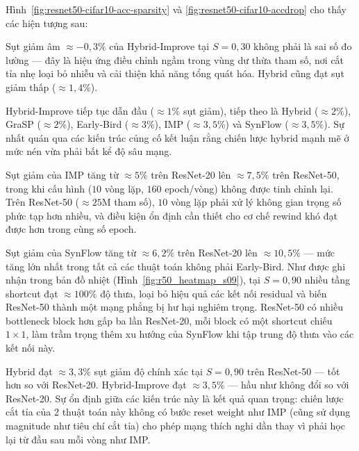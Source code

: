         Hình~\ref{fig:resnet50-cifar10-acc-sparsity} và \ref{fig:resnet50-cifar10-accdrop} cho thấy các hiện tượng sau:

        Sụt giảm âm $\approx-0{,}3\%$ của Hybrid-Improve tại $S=0{,}30$ không phải là sai số
        đo lường --- đây là hiệu ứng điều chỉnh ngầm trong vùng dư thừa tham số, nơi cắt tỉa
        nhẹ loại bỏ nhiễu và cải thiện khả năng tổng quát hóa.
        Hybrid cũng đạt sụt giảm thấp ($\approx1{,}4\%$).
        
        Hybrid-Improve tiếp tục dẫn đầu ($\approx1\%$ sụt giảm), tiếp theo là Hybrid
        ($\approx2\%$), GraSP ($\approx2\%$), Early-Bird ($\approx3\%$), IMP ($\approx3{,}5\%$)
        và SynFlow ($\approx3{,}5\%$).
        Sự nhất quán qua các kiến trúc củng cố kết luận rằng chiến lược hybrid mạnh mẽ ở mức nén
        vừa phải bất kể độ sâu mạng.
        
        Sụt giảm của IMP tăng từ $\approx5\%$ trên ResNet-20 lên $\approx7{,}5\%$ trên ResNet-50,
        trong khi cấu hình ($10$ vòng lặp, $160$ epoch/vòng) không được tinh chỉnh lại.
        Trên ResNet-50 ($\approx25$M tham số), $10$ vòng lặp phải xử lý không gian trọng số phức
        tạp hơn nhiều, và điều kiện ổn định cần thiết cho cơ chế rewind khó đạt được hơn trong
        cùng số epoch.
        
        Sụt giảm của SynFlow tăng từ $\approx6{,}2\%$ trên ResNet-20 lên $\approx10{,}5\%$ ---
        mức tăng lớn nhất trong tất cả các thuật toán không phải Early-Bird.
        Như được ghi nhận trong bản đồ nhiệt (Hình~\ref{fig:r50_heatmap_s09}), tại $S=0{,}90$
        nhiều tầng shortcut đạt $\approx100\%$ độ thưa, loại bỏ hiệu quả các kết nối residual và
        biến ResNet-50 thành một mạng phẳng bị hư hại nghiêm trọng.
        ResNet-50 có nhiều bottleneck block hơn gấp ba lần ResNet-20, mỗi block có một shortcut
        chiếu $1{\times}1$, làm trầm trọng thêm xu hướng của SynFlow khi tập trung độ thưa vào các
        kết nối này.
        
        Hybrid đạt $\approx3{,}3\%$ sụt giảm độ chính xác tại $S=0{,}90$ trên ResNet-50 --- tốt hơn so với
        ResNet-20.
        Hybrid-Improve đạt $\approx3{,}5\%$ --- hầu như không đổi so với ResNet-20.
        Sự ổn định giữa các kiến trúc này là kết quả quan trọng: chiến lược cắt tỉa của 2 thuật toán này không  
        có bước reset weight như IMP (cũng sử dụng magnitude như tiêu chí cắt tỉa) cho phép mạng thích nghi dần
        thay vì phải học lại từ đầu sau mỗi vòng như IMP.

